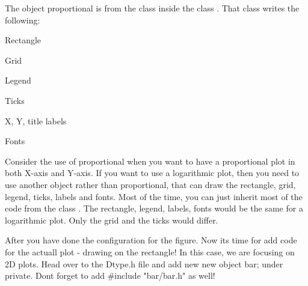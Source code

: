 \begin{DoxyCode}{0}
\end{DoxyCode}


The object {\ttfamily proportional} is from the class {\ttfamily {}} inside the class {\ttfamily {}}. That class writes the following\+:


\begin{DoxyItemize}
\item Rectangle
\item Grid
\item Legend
\item Ticks
\item X, Y, title labels
\item Fonts
\end{DoxyItemize}

Consider the use of {\ttfamily proportional} when you want to have a proportional plot in both X-\/axis and Y-\/axis. If you want to use a logarithmic plot, then you need to use another object rather than {\ttfamily proportional}, that can draw the rectangle, grid, legend, ticks, labels and fonts. Most of the time, you can just inherit most of the code from the class {\ttfamily {}}. The rectangle, legend, labels, fonts would be the same for a logarithmic plot. Only the grid and the ticks would differ.

After you have done the configuration for the {\ttfamily figure}. Now it\textquotesingle{}s time for add code for the actuall plot -\/ drawing on the rectangle! In this case, we are focusing on {\ttfamily 2D} plots. Head over to the {\+Dtype.\+h} file and add new new object {\ttfamily {} bar;} under private. Don\textquotesingle{}t forget to add {\ttfamily \#include "{}bar/bar.\+h"{}} as well!


